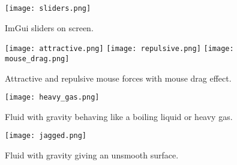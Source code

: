 \documentclass[write-up.tex]{subfiles}
\begin{document}
\begin{appendices}
\begin{figure}[h]
\centering
\texttt{[image: sliders.png]}
\caption{ImGui sliders on screen.}
\label{fig:sliders}
\end{figure}

\begin{figure}[h]
\centering
\texttt{[image: attractive.png]}
\texttt{[image: repulsive.png]}
\texttt{[image: mouse\_drag.png]}
\caption{Attractive and repulsive mouse forces with mouse drag effect.}
\label{fig:mouse_forces}
\end{figure}

\begin{figure}[h]
\centering
\texttt{[image: heavy\_gas.png]}
\caption{Fluid with gravity behaving like a boiling liquid or heavy gas.}
\label{fig:heavy_gas}
\end{figure}

\begin{figure}[h]
\centering
\texttt{[image: jagged.png]}
\caption{Fluid with gravity giving an unsmooth surface.}
\label{fig:jagged}
\end{figure}

\label{appendix:c}


\end{appendices}
\end{document}
